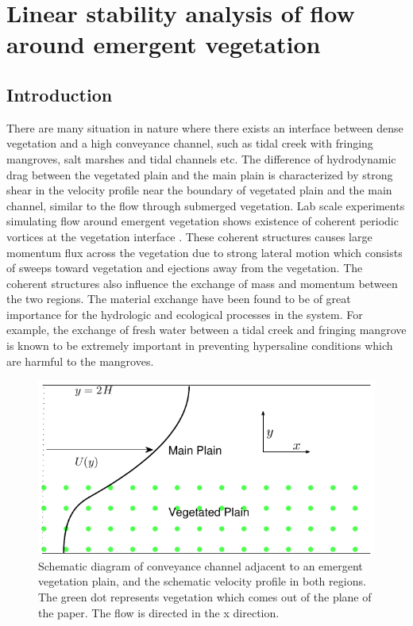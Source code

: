 \documentclass[12pt]{report}   %
\begin{document}
\chapter{Linear stability analysis of flow around emergent vegetation}
\section{Introduction}
There are many situation in nature where there exists an interface between dense vegetation and a high conveyance channel, such as tidal creek with fringing mangroves, salt marshes and tidal channels etc. The difference of hydrodynamic drag between the vegetated plain and the main plain is characterized by strong shear in the velocity profile near the boundary of vegetated plain and the main channel, similar to the flow through submerged vegetation. Lab scale experiments simulating flow around emergent vegetation shows existence of coherent periodic vortices at the vegetation interface \cite{White07}. These coherent structures causes large momentum flux across the vegetation due to strong lateral motion which consists of sweeps toward vegetation and ejections away from the vegetation. The coherent structures also influence the exchange of mass and momentum between the two regions. The material exchange have been found to be of great importance for the hydrologic and ecological processes in the system. For 
example, the exchange of fresh water between a tidal creek and fringing mangrove is known to be extremely important in preventing hypersaline conditions which are harmful to the mangroves.  

\begin{figure}
\centerline{\includegraphics{GrassBaseIsotropicDrag}}
\caption [ Schematic diagram of conveyance channel adjacent to an emergent vegetation plain, and the schematic velocity profile in both regions. ] {Schematic diagram of conveyance channel adjacent to an emergent vegetation plain, and the schematic velocity profile in both regions. The green dot represents vegetation which comes out of the plane of the paper. The flow is directed in the x direction.}
\label{IsotropicSchematic}
\end{figure}
\end{document}
